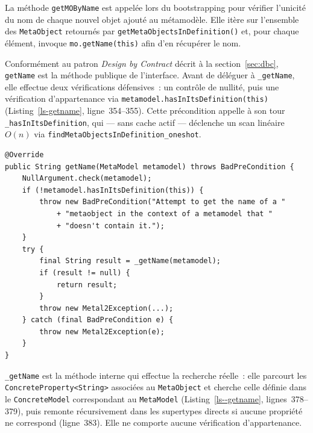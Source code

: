 La méthode \texttt{getMOByName} est appelée lors du bootstrapping pour
vérifier l'unicité du nom de chaque nouvel objet ajouté au métamodèle.
Elle itère sur l'ensemble des \texttt{MetaObject} retournés par
\texttt{getMetaObjectsInDefinition()} et, pour chaque élément, invoque
\texttt{mo.getName(this)} afin d'en récupérer le nom.

Conformément au patron \textit{Design by Contract} décrit à la
section~\ref{sec:dbc}, \texttt{getName} est la méthode publique de
l'interface. Avant de déléguer à \texttt{\_getName}, elle effectue deux
vérifications défensives~: un contrôle de nullité, puis une vérification
d'appartenance via \texttt{metamodel.hasInItsDefinition(this)}
(Listing~\ref{ls-getname}, ligne~354--355). Cette précondition appelle à
son tour \texttt{\_hasInItsDefinition}, qui --- sans cache actif ---
déclenche un scan linéaire $O(n)$ via
\texttt{findMetaObjectsInDefinition\_oneshot}.

\begin{lstlisting}[firstnumber=352,
  caption={\texttt{getName} --- méthode publique de \texttt{MetaObject\_impl},
  bundle \texttt{metadone\_bundle\_metabusiness}. La précondition
  ligne~354--355 déclenche un scan $O(n)$ à chaque appel.},
  label={ls-getname}]
@Override
public String getName(MetaModel metamodel) throws BadPreCondition {
    NullArgument.check(metamodel);
    if (!metamodel.hasInItsDefinition(this)) {
        throw new BadPreCondition("Attempt to get the name of a "
            + "metaobject in the context of a metamodel that "
            + "doesn't contain it.");
    }
    try {
        final String result = _getName(metamodel);
        if (result != null) {
            return result;
        }
        throw new Metal2Exception(...);
    } catch (final BadPreCondition e) {
        throw new Metal2Exception(e);
    }
}
\end{lstlisting}

\texttt{\_getName} est la méthode interne qui effectue la recherche
réelle~: elle parcourt les \texttt{ConcreteProperty<String>} associées
au \texttt{MetaObject} et cherche celle définie dans le
\texttt{ConcreteModel} correspondant au \texttt{MetaModel}
(Listing~\ref{ls--getname}, lignes~378--379), puis remonte
récursivement dans les supertypes directs si aucune propriété ne
correspond (ligne~383). Elle ne comporte aucune vérification
d'appartenance.


